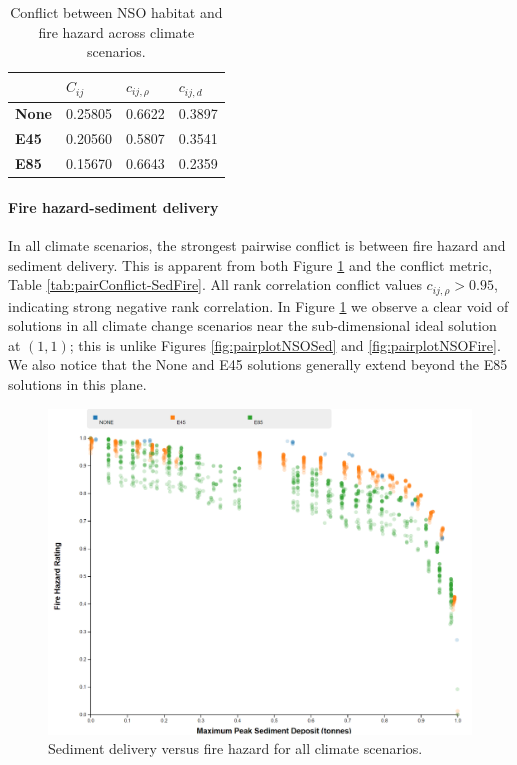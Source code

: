 \begin{table}[]
\centering
\caption[NSO-fire hazard conflict across climate scenarios]{Conflict between NSO habitat and fire hazard across climate scenarios.}
\label{tab:pairConflict-NSOFire}
\begin{tabular}{l|l|ll}
\textbf{}     & \textbf{$C_{ij}$} & \textbf{$c_{ij,\rho}$} & \textbf{$c_{ij,d}$} \\ \hline
\textbf{None} & 0.25805           & 0.6622                 & 0.3897              \\
\textbf{E45}  & 0.20560           & 0.5807                 & 0.3541              \\
\textbf{E85}  & 0.15670           & 0.6643                 & 0.2359
\end{tabular}
\end{table}

\paragraph{Fire hazard-sediment delivery}
In all climate scenarios, the strongest pairwise conflict is between fire hazard and sediment delivery. This is apparent from both Figure \ref{fig:pairplotSedFire} and the conflict metric, Table \ref{tab:pairConflict-SedFire}. All rank correlation conflict values $c_{ij,\rho} > 0.95$, indicating strong negative rank correlation. In Figure \ref{fig:pairplotSedFire} we observe a clear void of solutions in all climate change scenarios near the sub-dimensional ideal solution at $(1,1)$; this is unlike Figures \ref{fig:pairplotNSOSed} and \ref{fig:pairplotNSOFire}. We also notice that the None and E45 solutions generally extend beyond the E85 solutions in this plane.

\begin{figure}[ht]
\centering
\includegraphics[width=.75\textwidth]{../images/2DSlice_Sed_Fire}
\caption[Sediment delivery vs. fire hazard for all climate scenarios]{Sediment delivery versus fire hazard for all climate scenarios.}
\label{fig:pairplotSedFire}
\end{figure}

